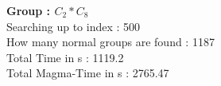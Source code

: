 \textbf{Group : $C_2*C_8$}\\
Searching up to index : 500\\
How many normal groups are found : 1187\\
Total Time in s : 1119.2\\
Total Magma-Time in s : 2765.47\\
